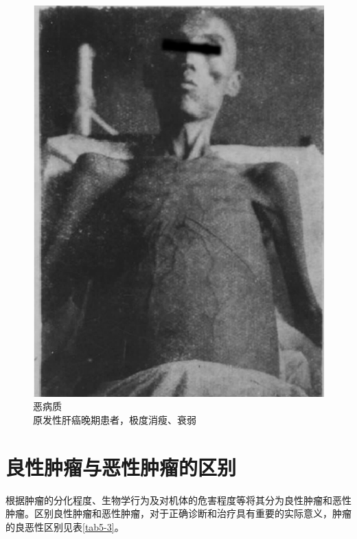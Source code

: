 \begin{figure}[!htbp]
 \centering
 \includegraphics{./images/Image00079.jpg}
 \caption{恶病质 \\ {\small 原发性肝癌晚期患者，极度消瘦、衰弱}}
 \label{fig5-12}
  \end{figure}



\section{良性肿瘤与恶性肿瘤的区别}

根据肿瘤的分化程度、生物学行为及对机体的危害程度等将其分为良性肿瘤和恶性肿瘤。区别良性肿瘤和恶性肿瘤，对于正确诊断和治疗具有重要的实际意义，肿瘤的良恶性区别见表\ref{tab5-3}。

